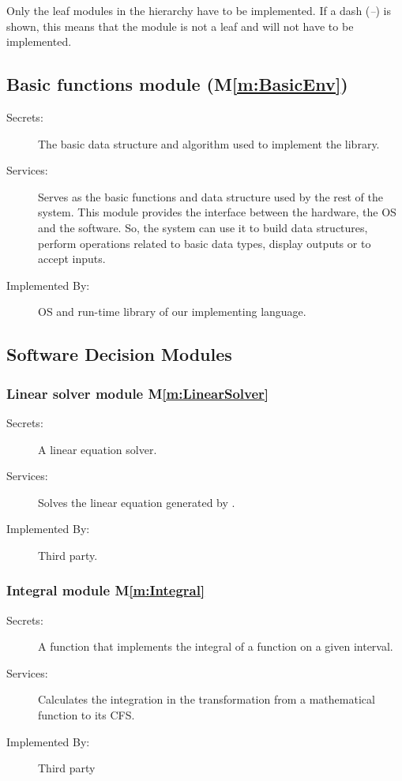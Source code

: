 \documentclass[12pt, titlepage]{article}
\newcommand{\mref}[1]{M\ref{m:#1}}
\begin{document}
Only the leaf modules in the hierarchy have to be implemented. If a dash
(\emph{--}) is shown, this means that the module is not a leaf and will not have
to be implemented.

\subsection{Basic functions module (\mref{BasicEnv})}

\begin{description}
\item[Secrets:]The basic data structure and algorithm used to implement the library.
\item[Services:]Serves as the basic functions and data structure used by the rest of the
  system. This module provides the interface between the hardware, the OS and the
  software. So, the system can use it to build data structures, perform operations related to basic data types, display outputs or to accept inputs.
\item[Implemented By:] OS and run-time library of our implementing language.
\end{description}
\subsection{Software Decision Modules}
\subsubsection{Linear solver module \mref{LinearSolver}}

\begin{description}
\item[Secrets:]A linear equation solver.
\item[Services:]Solves the linear equation generated by \progname.
\item[Implemented By:] Third party.
\end{description}
\subsubsection{Integral module \mref{Integral}}

\begin{description}
	\item[Secrets:]A function that implements the integral of a function on a given interval.
	\item[Services:]Calculates the integration in the transformation from a mathematical function to its CFS.
	\item[Implemented By:] Third party
\end{description}
\end{document}
